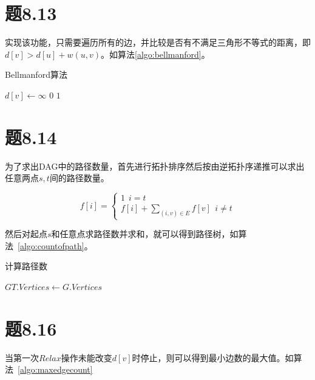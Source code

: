 \documentclass[a4paper,twoside]{article}
\begin{document}
\begin{spacing}{1.2}
\section{题8.13}

实现该功能，只需要遍历所有的边，并比较是否有不满足三角形不等式的距离，即
$d[v]>d[u]+w(u,v)$。如算法\ref{algo:bellmanford}。

\begin{algorithm}[H]
	\caption{Bellmanford算法}
	\label{algo:bellmanford}
	\begin{algorithmic}[1]		
			\State {}
			\EndFor
		\EndFor
				\State $d[v]\gets \infty$
				\State \Return $0$
			\EndIf
		\EndFor
		\State \Return $1$
		\EndProcedure
	\end{algorithmic}
\end{algorithm}	

\section{题8.14}

为了求出DAG中的路径数量，首先进行拓扑排序然后按由逆拓扑序递推可以求出任意两点$s, t$间的路径数量。

\begin{equation}
	f[i]=
	\begin{cases}
		1 \ \ i=t \\
		f[i]+\sum_{(i,v)\in E} f[v] \ \ i\neq t
	\end{cases}
\end{equation}

然后对起点$s$和任意点求路径数并求和，就可以得到路径树，如算法~\ref{algo:countofpath}。

\begin{algorithm}
	\caption{计算路径数}
	\label{algo:countofpath}
	\begin{algorithmic}[1]		
		\State $GT.Vertices\gets G.Vertices$

		\EndProcedure
	\end{algorithmic}
\end{algorithm}	

\section{题8.16}

当第一次$Relax$操作未能改变$d[v]$时停止，则可以得到最小边数的最大值。如算法~\ref{algo:maxedgecount}


\end{spacing}
\end{document}
